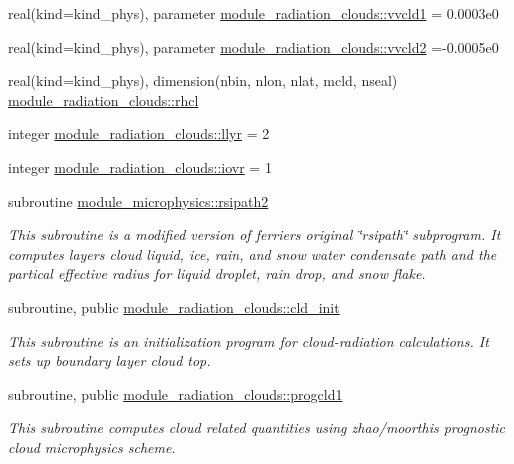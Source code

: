 \begin{DoxyCompactItemize}
\item 
real(kind=kind\+\_\+phys), parameter \hyperlink{group__module__radiation__clouds_ga6ec3c0444de53580befd4bb4d39844d3}{module\+\_\+radiation\+\_\+clouds\+::vvcld1} = 0.\+0003e0
\item 
real(kind=kind\+\_\+phys), parameter \hyperlink{group__module__radiation__clouds_ga67962e77fb073cc25cafaaba0c2fa833}{module\+\_\+radiation\+\_\+clouds\+::vvcld2} =-\/0.\+0005e0
\item 
real(kind=kind\+\_\+phys), dimension(nbin, nlon, nlat, mcld, nseal) \hyperlink{group__module__radiation__clouds_ga9673faf82ef00e0501763664743e3720}{module\+\_\+radiation\+\_\+clouds\+::rhcl}
\item 
integer \hyperlink{group__module__radiation__clouds_ga3390b20d42afccb3ec569a5b69a93f6e}{module\+\_\+radiation\+\_\+clouds\+::llyr} = 2
\item 
integer \hyperlink{group__module__radiation__clouds_ga5cfafee79e8cf066ddd8440cdfdc41a0}{module\+\_\+radiation\+\_\+clouds\+::iovr} = 1
\end{DoxyCompactItemize}
\begin{DoxyCompactItemize}
\item 
subroutine \hyperlink{group__module__radiation__clouds_ga3645dec44f2cc7e30b57d32531f74ba4}{module\+\_\+microphysics\+::rsipath2}
\begin{DoxyCompactList}\small\item\em This subroutine is a modified version of ferrier\textquotesingle{}s original \char`\"{}rsipath\char`\"{} subprogram. It computes layer\textquotesingle{}s cloud liquid, ice, rain, and snow water condensate path and the partical effective radius for liquid droplet, rain drop, and snow flake. \end{DoxyCompactList}\end{DoxyCompactItemize}
\begin{DoxyCompactItemize}
\item 
subroutine, public \hyperlink{group__module__radiation__clouds_ga026c2d6859be7119ee7ff11fe760dfcc}{module\+\_\+radiation\+\_\+clouds\+::cld\+\_\+init}
\begin{DoxyCompactList}\small\item\em This subroutine is an initialization program for cloud-\/radiation calculations. It sets up boundary layer cloud top. \end{DoxyCompactList}\end{DoxyCompactItemize}
\begin{DoxyCompactItemize}
\item 
subroutine, public \hyperlink{group__module__radiation__clouds_gae0f48ab3ed8fcd777d7abaa4f26f2eaf}{module\+\_\+radiation\+\_\+clouds\+::progcld1}
\begin{DoxyCompactList}\small\item\em This subroutine computes cloud related quantities using zhao/moorthi\textquotesingle{}s prognostic cloud microphysics scheme. \end{DoxyCompactList}\end{DoxyCompactItemize}
